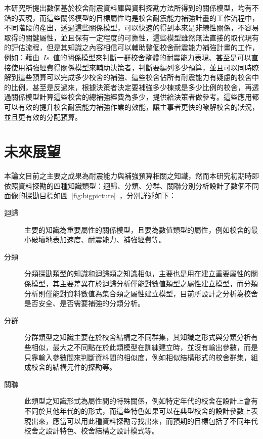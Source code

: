 本研究所提出數個基於校舍耐震資料庫與資料探勘方法所得到的關係模型，均有不錯的表現，而這些關係模型的目標屬性均是校舍耐震能力補強計畫的工作流程中，不同階段的產出，透過這些關係模型，可以快速的得到本來是非線性關係，不容易取得的關鍵屬性，並且保有一定程度的可靠性，這些模型雖然無法直接的取代現有的評估流程，但是其知識之內容相信可以輔助整個校舍耐震能力補強計畫的工作，例如：藉由~$Is$~值的關係模型來判斷一群校舍整體的耐震能力表現、甚至是可以直接使用補強經費得關係模型來輔助決策者，判斷要編列多少預算，並且可以同時瞭解到這些預算可以完成多少校舍的補強、這些校舍佔所有耐震能力有疑慮的校舍中的比例，甚至是反過來，根據決策者決定要補強多少棟或是多少比例的校舍，再透過關係模型計算這些校舍的總補強經費為多少，提供給決策者做參考。這些應用都可以有效的提升校舍耐震能力補強作業的效能，讓主事者更快的瞭解校舍的狀況，並且更有效的分配預算。

\section{未來展望} 

本論文目前之主要之成果為耐震能力與補強預算相關之知識，然而本研究初期時即依照資料探勘的四種知識類型：迴歸、分類、分群、關聯分別分析設計了數個不同面像的探勘目標如圖~\ref{fig:bigpicture}~，分別詳述如下：

\begin{description}
  \item[迴歸]
  主要的知識為重要屬性的關係模型，且要為數值類型的屬性，例如校舍的最小破壞地表加速度、耐震能力、補強經費等。
  \item[分類]
  分類探勘類型的知識和迴歸類之知識相似，主要也是用在建立重要屬性的關係模型，其主要差異在於迴歸分析僅能對數值類型之屬性建立模型，而分類分析則僅能對資料數值為集合類之屬性建立模型，目前所設計之分析為校舍是否安全、是否需要補強的分類分析。
  \item[分群]
  分群類型之知識主要在於校舍結構之不同群集，其知識之形式與分類分析有些相似，最大之不同點在於此類模型在訓練建立時，並沒有輸出參數，而是只靠輸入參數間來判斷資料間的相似度，例如相似結構形式的校舍群集，組成校舍的結構元件的探勘等。
  \item[關聯]
  此類型之知識形式為屬性間的特殊關係，例如特定年代的校舍在設計上會有不同於其他年代的的形式，而這些特色如果可以在典型校舍的設計參數上表現出來，應當可以用此種資料探勘尋找出來，而預期的目標包括了不同年代校舍之設計特色、校舍結構之設計模式等。
\end{description}

